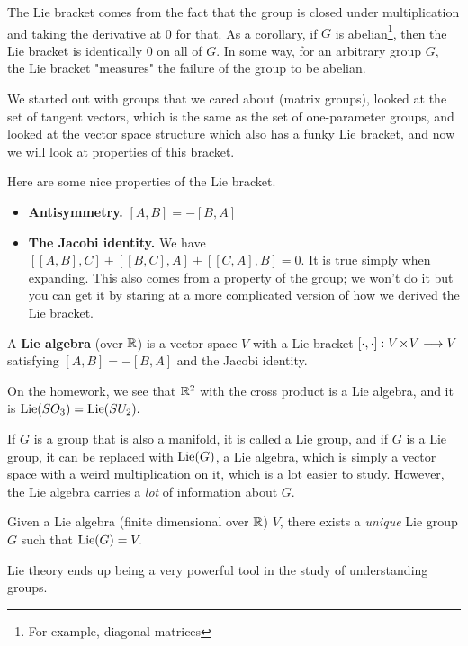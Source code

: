 The Lie bracket comes from the fact that the group is closed under multiplication and taking the derivative at 0 for that. As a corollary, if $G$ is abelian\footnote{For example, diagonal matrices}, then the Lie bracket is identically 0 on all of $G.$ In some way, for an arbitrary group $G,$ the Lie bracket "measures" the failure of the group to be abelian. 

We started out with groups that we cared about (matrix groups), looked at the set of tangent vectors, which is the same as the set of one-parameter groups, and looked at the vector space structure which also has a funky Lie bracket, and now we will look at properties of this bracket.

Here are some nice properties of the Lie bracket.
\begin{itemize}
    \item \textbf{Antisymmetry.} $[A, B] = -[B, A]$
    \item \textbf{The Jacobi identity.} We have $[[A, B], C] + [[B, C], A] + [[C, A], B] = 0.$ It is true simply when expanding. This also comes from a property of the group; we won't do it but you can get it by staring at a more complicated version of how we derived the Lie bracket. %
\end{itemize}

\begin{definition}
A \textbf{Lie algebra} (over $\mathbb R$) is a vector space $V$ with a Lie bracket $[\cdot, \cdot]: V \hspace{0.05em}{\times}\hspace{0.05em} V \longrightarrow V$ satisfying $[A, B] = -[B, A]$ and the Jacobi identity.
\end{definition}

On the homework, we see that $\mathbb R^2$ with the cross product is a Lie algebra, and it is $\operatorname{Lie}(SO_3) = \operatorname{Lie}(SU_2).$

If $G$ is a group that is also a manifold, it is called a Lie group, and if $G$ is a Lie group, it can be replaced with $\operatorname{Lie}(G)$, a Lie algebra, which is simply a vector space with a weird multiplication on it, which is a lot easier to study. However, the Lie algebra carries a \emph{lot} of information about $G.$ 

\begin{theorem}
Given a Lie algebra (finite dimensional over $\mathbb R$) $V$, there exists a \emph{unique} Lie group $G$ such that $\operatorname{Lie}(G) = V.$
\end{theorem}

Lie theory ends up being a very powerful tool in the study of understanding groups.

\newpage